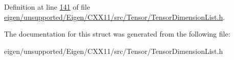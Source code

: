 Definition at line \hyperlink{eigen_2unsupported_2_eigen_2_c_x_x11_2src_2_tensor_2_tensor_dimension_list_8h_source_l00141}{141} of file \hyperlink{eigen_2unsupported_2_eigen_2_c_x_x11_2src_2_tensor_2_tensor_dimension_list_8h_source}{eigen/unsupported/\+Eigen/\+C\+X\+X11/src/\+Tensor/\+Tensor\+Dimension\+List.\+h}.



The documentation for this struct was generated from the following file\+:\begin{DoxyCompactItemize}
\item 
eigen/unsupported/\+Eigen/\+C\+X\+X11/src/\+Tensor/\+Tensor\+Dimension\+List.\+h\end{DoxyCompactItemize}
